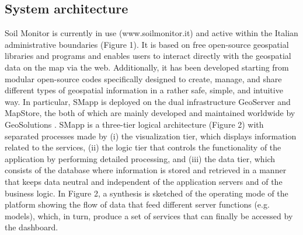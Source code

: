 \documentclass[APA,LATO1COL,doublespace]{WileyNJD-v2}
\begin{document}
\subsection{System architecture}
Soil Monitor is currently in use (www.soilmonitor.it) and active within the Italian administrative boundaries (Figure 1). It is based on free open-source geospatial libraries and programs and enables users to interact directly with the geospatial data on the map via the web. Additionally, it has been developed starting from modular open-source codes specifically designed to create, manage, and share different types of geospatial information in a rather safe, simple, and intuitive way. In particular, SMapp is deployed on the dual infrastructure GeoServer and MapStore, the both of which are mainly developed and maintained worldwide by GeoSolutions .
SMapp is a three-tier logical architecture (Figure 2) with separated processes made by (i) the visualization tier, which displays information related to the services, (ii) the logic tier that controls the functionality of the application by performing detailed processing, and (iii) the data tier, which consists of the database where information is stored and retrieved in a manner that keeps data neutral and independent of the application servers and of the business logic.
In Figure 2, a synthesis is sketched of the operating mode of the platform showing the flow of data that feed different server functions (e.g. models), which, in turn, produce a set of services that can finally be accessed by the dashboard.
\end{document}
